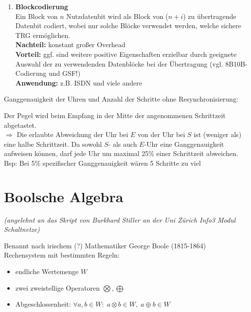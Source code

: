 \documentclass[10pt,a4paper]{scrartcl}
\begin{document}
\begin{enumerate}
	\item \textbf{Blockcodierung}\\
	Ein Block von $n$ Nutzdatenbit wird als Block von ($n+i$) zu übertragende Datenbit codiert, wobei nur solche Blöcke verwendet werden, welche sichere \ac{TRG} ermöglichen.
	\\[0.25em]
	\textbf{Nachteil:} konstant großer Overhead
	\\[0.25em]
	\textbf{Vorteil:} ggf. sind weitere positive Eigenschaften erzielbar durch geeignete Auswahl der zu verwendenden Datenblöcke bei der Übertragung (vgl. 8B10B-Codierung und \ac{GSF}!)
	\\[0.25em]
	\textbf{Anwendung:} z.B. ISDN und viele andere
\end{enumerate}

Ganggenauigkeit der Uhren und Anzahl der Schritte ohne Resynchronisierung:
\begin{center}
\end{center}
Der Pegel wird beim Empfang in der Mitte der angenommenen Schrittzeit abgetastet.\\
\hspace*{1em} $\Rightarrow$ Die erlaubte Abweichung der Uhr bei $E$ von der Uhr bei $S$ ist (weniger als) eine halbe Schrittzeit. Da sowohl $S$- als auch $E$-Uhr eine Ganggenauigkeit aufweisen können, darf jede Uhr um maximal 25\% einer Schrittzeit abweichen.\\[0.5em]
Bsp: Bei 5\% spezifischer Ganggenauigkeit wären 5 Schritte \glqq zu viel\grqq

\newpage
\section{Boolsche Algebra}
\begin{center}
	\textit{(angelehnt an das Skript von Burkhard Stiller an der Uni Zürich \glqq Info3 Modul Schaltnetze\grqq)
}
\end{center}
Benannt nach irischem (?) Mathematiker George Boole (1815-1864)\\
Rechensystem mit bestimmten Regeln:
\begin{itemize}
\item endliche Wertemenge $W$
\item zwei zweistellige Operatoren $\bigotimes, \bigoplus$
\item Abgeschlossenheit: $\forall a, b \in W\!: \; a \otimes  b \in W, \; a \oplus b \in W$
\end{itemize}
\end{document}
